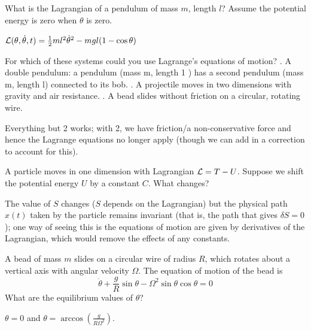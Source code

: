 \begin{p}
What is the Lagrangian of a pendulum of mass $m$, length $l$? Assume the potential energy is zero when $\theta$ is zero.
\end{p}
\begin{s}
$\mathcal{L}(\theta, \dot{\theta}, t) = \frac{1}{2}ml^2\dot{\theta}^2 - mgl(1-\cos\theta)$
\end{s}

\begin{p}
For which of these systems could you use Lagrange's equations of motion?
. A double pendulum: a pendulum (mass $\mathrm{m}$, length 1 ) has a second pendulum (mass $\mathrm{m}$, length l) connected to its bob.
. A projectile moves in two dimensions with gravity and air resistance.
. A bead slides without friction on a circular, rotating wire.
\end{p}
\begin{s}
Everything but 2 works; with 2, we have friction/a non-conservative force and hence the Lagrange equations no longer apply (though we can add in a correction to account for this).
\end{s}

\begin{p}
A particle moves in one dimension with Lagrangian $\mathcal{L} = T - U$. Suppose we shift the potential energy $U$ by a constant $C$. What changes?
\end{p}
\begin{s}
The value of $S$ changes ($S$ depends on the Lagrangian) but the physical path $x(t)$ taken by the particle remains invariant (that is, the path that gives $\delta S = 0$); one way of seeing this is the equations of motion are given by derivatives of the Lagrangian, which would remove the effects of any constants.
\end{s}

\begin{p}
A bead of mass $m$ slides on a circular wire of radius $R$, which rotates about a vertical axis with angular velocity $\Omega$. The equation of motion of the bead is \[\ddot{\theta} + \frac{g}{R}\sin\theta - \Omega^2\sin\theta\cos\theta = 0\]
What are the equilibrium values of $\theta$?
\end{p}
\begin{s}
$\theta = 0$ and $\theta = \arccos(\frac{g}{R\Omega^2})$.
\end{s}

